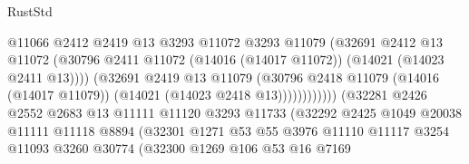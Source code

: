 \begin{lexlean}{RustStd}
\begin{coremodule}
                                          @11066
                                          @2412
                                          @2419
                                          @13
                                          @3293
                                          @11072
                                          @3293
                                          @11079
                                          (@32691
                                            @2412
                                            @13
                                            @11072
                                            (@30796
                                              @2411
                                              @11072
                                              (@14016 (@14017 @11072))
                                              (@14021 (@14023 @2411 @13))))
                                          (@32691
                                            @2419
                                            @13
                                            @11079
                                            (@30796
                                              @2418
                                              @11079
                                              (@14016 (@14017 @11079))
                                              (@14021 (@14023 @2418 @13))))))))))))
                          (@32281
                            @2426
                            @2552
                            @2683
                            @13
                            @11111
                            @11120
                            @3293
                            @11733
                            (@32292
                              @2425
                              @1049
                              @20038
                              @11111
                              @11118
                              @8894
                              (@32301
                                @1271
                                @53
                                @55
                                @3976
                                @11110
                                @11117
                                @3254
                                @11093
                                @3260
                                @30774
                                (@32300
                                  @1269
                                  @106
                                  @53
                                  @16
                                  @7169

\end{coremodule}
\end{lexlean}
